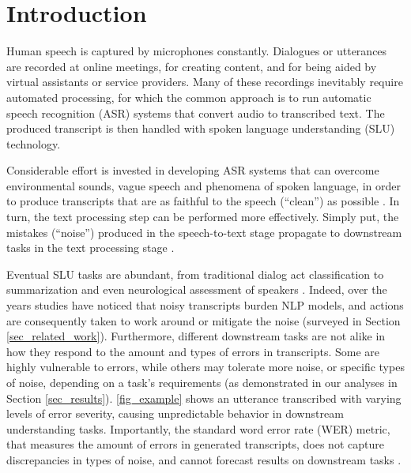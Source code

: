 \section{Introduction}
\label{sec_introduction}

Human speech is captured by microphones constantly. Dialogues or utterances are recorded at online meetings, for creating content, and for being aided by virtual assistants or service providers. Many of these recordings inevitably require automated processing, for which the common approach is to run automatic speech recognition (ASR) systems that convert audio to transcribed text. The produced transcript is then handled
with spoken language understanding (SLU) technology. 

Considerable effort is invested in developing ASR systems that can overcome environmental sounds, vague speech and phenomena of spoken language,
in order to produce transcripts that are as faithful to the speech (``clean'') as possible \citep{iwamoto2022artifacts, Prabhavalkar2023surveyASR}. In turn, the text processing step can be performed more effectively. Simply put, the mistakes (``noise'') produced in the speech-to-text stage propagate to downstream tasks in the text processing stage \citep{kubis-etal-2023-back, feng2022asrglue}.



Eventual SLU tasks are abundant, from traditional dialog act classification \citep{shriberg-etal-2004-icsi} to summarization \citep{Waibel1998summ} and even neurological assessment of speakers \citep{Roshanzamir2021Alzheimer}. 
Indeed, over the years studies have noticed that noisy transcripts burden NLP models, and actions are consequently taken to work around or mitigate the noise (surveyed in Section \ref{sec_related_work}). Furthermore, different downstream tasks are not alike in how they respond to the amount and types of errors in transcripts. Some are highly vulnerable to errors, while others may tolerate more noise, or specific types of noise, depending on a task's requirements (as demonstrated in our analyses in Section \ref{sec_results}).
\autoref{fig_example} shows an utterance transcribed with varying levels of error severity, causing unpredictable behavior in downstream understanding tasks. 
Importantly, the standard word error rate (WER) metric, that measures the amount of errors in generated transcripts, does not capture discrepancies in types of noise, and cannot forecast results on downstream tasks \citep{wang2003indicator}.

